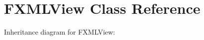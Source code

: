 \hypertarget{class_f_x_m_l_view}{}\section{F\+X\+M\+L\+View Class Reference}
\label{class_f_x_m_l_view}


Inheritance diagram for F\+X\+M\+L\+View\+:
